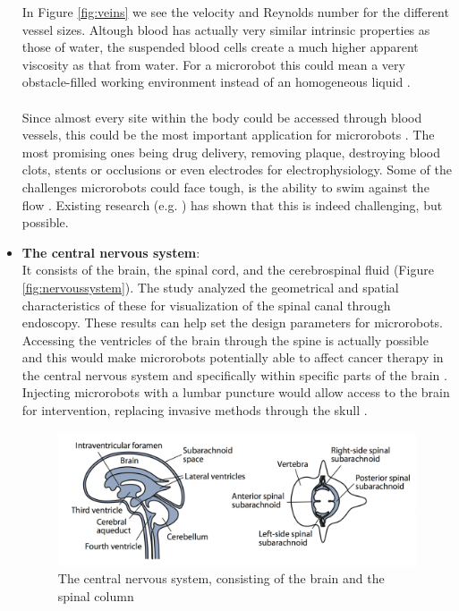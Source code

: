 \begin{itemize}
   In Figure \ref{fig:veins} we see the velocity and Reynolds number for the different vessel sizes. Altough blood has actually very similar intrinsic properties as those of water, the suspended blood cells create a much higher apparent viscosity as that from water. For a microrobot this could mean a very obstacle-filled working environment instead of an homogeneous liquid \cite{berger1996}. \\\\
Since almost every site within the body could be accessed through blood vessels, this could be the most important application for microrobots \cite{Nelson2010}. The most promising ones being drug delivery, removing plaque, destroying blood clots, stents or occlusions or even electrodes for electrophysiology. Some of the challenges microrobots could face tough, is the ability to swim against the flow \cite{Nelson2010}. Existing research (e.g. \cite{Cha2010}) has shown that this is indeed challenging, but possible.
\item \textbf{The central nervous system}: \\ It consists of the brain, the spinal cord, and the cerebrospinal fluid (Figure \ref{fig:nervoussystem}). The study \cite{Zaaroor2006} analyzed the geometrical and spatial characteristics of these for visualization of the spinal canal through endoscopy. These results can help set the design parameters for microrobots. Accessing the ventricles of the brain through the spine is actually possible and this would make microrobots potentially able to affect cancer therapy in the central nervous system and specifically within specific parts of the brain \cite{Nelson2010}. Injecting microrobots with a lumbar puncture would allow access to the brain for intervention, replacing invasive methods through the skull \cite{Purdy2003}. 
\begin{figure}[ht]
	\centering
  \includegraphics[width=1\textwidth]{Pictures/nervoussystem.png}
	\caption{The central nervous system, consisting of the brain and the spinal column \cite{Nelson2010}}

\end{figure}
\end{itemize}
